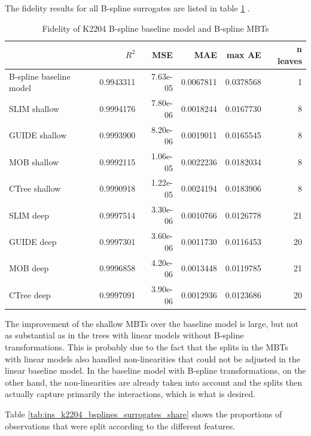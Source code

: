 The fidelity results for all B-spline surrogates are listed in table \ref{tab:ins_k2204_bsplines_surrogates_perf} .

\begin{table}

\caption{Fidelity of K2204 B-spline baseline model and  B-spline MBTs}
\centering
\begin{tabular}[t]{l|r|r|r|r|r}
\hline
  & $R^2$ & MSE & MAE & max AE & n leaves\\
\hline
B-spline baseline model & 0.9943311 & 7.63e-05 & 0.0067811 & 0.0378568 & 1\\
\hline
SLIM shallow & 0.9994176 & 7.80e-06 & 0.0018244 & 0.0167730 & 8\\
GUIDE shallow & 0.9993900 & 8.20e-06 & 0.0019011 & 0.0165545 & 8\\
MOB shallow & 0.9992115 & 1.06e-05 & 0.0022236 & 0.0182034 & 8\\
CTree shallow & 0.9990918 & 1.22e-05 & 0.0024194 & 0.0183906 & 8\\
\hline
SLIM deep & 0.9997514 & 3.30e-06 & 0.0010766 & 0.0126778 & 21\\
GUIDE deep & 0.9997301 & 3.60e-06 & 0.0011730 & 0.0116453 & 20\\
MOB deep & 0.9996858 & 4.20e-06 & 0.0013448 & 0.0119785 & 21\\
CTree deep & 0.9997091 & 3.90e-06 & 0.0012936 & 0.0123686 & 20\\
\hline
\end{tabular}
\label{tab:ins_k2204_bsplines_surrogates_perf}
\end{table}


The improvement of the shallow MBTs over the baseline model is large, but not as substantial as in the trees with linear models without B-spline transformations. This is probably due to the fact that the splits in the MBTs with linear models also handled non-linearities that could not be adjusted in the linear baseline model. In the baseline model with B-spline transformations, on the other hand, the non-linearities are already taken into account and the splits then actually capture primarily the interactions, which is what is desired. 



Table \ref{tab:ins_k2204_bsplines_surrogates_share}  shows the proportions of observations that were split according to the different features. 


